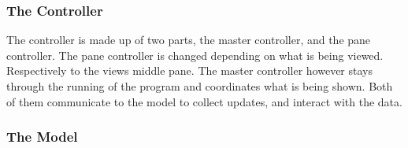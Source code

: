 \subsubsection{The Controller}
\label{subsubsec:the_controller}

The controller is made up of two parts, the master controller, and the pane controller. The pane controller is changed depending on what is being viewed. Respectively to the views middle pane. The master controller however stays through the running of the program and coordinates what is being shown. Both of them communicate to the model to collect updates, and interact with the data.

\subsubsection{The Model}
\label{subsubsec:the_model}

